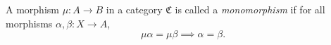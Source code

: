 A morphism $\mu : A \to B$ in a category $\mathfrak{C}$ is called a \textit{monomorphism} if for all morphisms $\alpha, \beta : X \to A$,
$$
\mu \alpha = \mu \beta \implies \alpha = \beta.
$$

